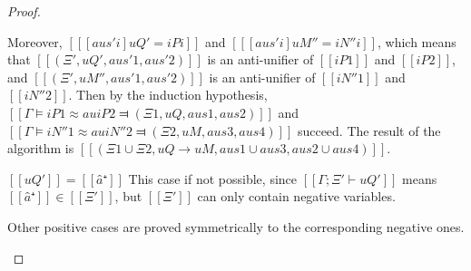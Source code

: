 \begin{proof}
\begin{caseof}
            Moreover, $[[ [aus'i]uQ' = iPi ]]$ and $[[ [aus'i]uM'' = iN''i ]]$, which means that
            $[[(Ξ', uQ', aus'1, aus'2)]]$ is an anti-unifier of $[[iP1]]$ and $[[iP2]]$,
            and $[[(Ξ', uM'', aus'1, aus'2)]]$ is an anti-unifier of $[[iN''1]]$ and $[[iN''2]]$.
            Then by the induction hypothesis, 
            $[[Γ ⊨ iP1 ≈au iP2 ⫤ (Ξ1, uQ, aus1, aus2)]]$ and 
            $[[Γ ⊨ iN''1 ≈au iN''2 ⫤ (Ξ2, uM, aus3, aus4)]]$ succeed.
            The result of the algorithm is $[[(Ξ1 ∪ Ξ2, uQ → uM, aus1 ∪ aus3, aus2 ∪ aus4)]]$.

        \item $[[uQ']] = [[â⁺]]$ 
            This case if not possible, since $[[Γ ; Ξ' ⊢ uQ']]$ means 
            $[[â⁺]] \in [[Ξ']]$, but $[[Ξ']]$ can only contain negative variables. 

        \item Other positive cases are proved symmetrically to the corresponding negative ones.
    \end{caseof}
\end{proof}

